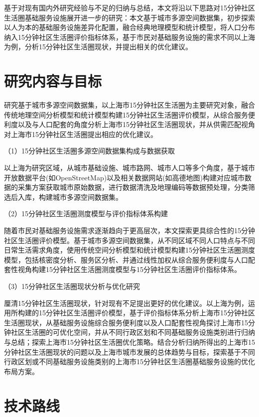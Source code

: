 \documentclass{shnuthesis}
\begin{document}
基于对现有国内外研究经验与不足的归纳与总结，本文将沿以下思路对15分钟社区生活圈基础服务设施展开进一步的研究：本文基于城市多源空间数据集，初步探索以人为本的基础服务设施差异化配置，融合经典地理模型和统计模型，将人口分布纳入15分钟社区生活圈评价指标体系，基于市民对基础服务设施的需求不同以上海为例，分析15分钟社区生活圈现状，并提出相关的优化建议。


\section{研究内容与目标}

研究基于城市多源空间数据集，以上海市15分钟社区生活圈为主要研究对象，融合传统地理空间分析模型和统计模型构建15分钟社区生活圈评价模型，从综合服务便利度以及与人口配套的角度分析上海市15分钟社区生活圈现状，并从供需匹配视角对上海市15分钟社区生活圈提出相应的优化建议。

（1）15分钟社区生活圈多源空间数据集构成与数据获取

以上海为研究区域，从城市基础设施、城市路网、城市人口等多个角度，基于城市开放数据平台(如OpenStreetMap)以及相关数据网站(如高德地图)构建对应城市数据的采集方案获取城市原始数据，进行数据清洗及地理编码等数据预处理，分类筛选后入库，构建城市多源空间数据集。

（2）15分钟社区生活圈测度模型与评价指标体系构建

随着市民对基础服务设施需求逐渐趋向于更高层次，本文探索更具综合性的15分钟社区生活圈评价模型。基于城市多源空间数据集，从不同区域不同人口特点与不同日常生活需求角度，使用传统空间分析模型和统计模型构建15分钟社区生活圈测度模型，包括核密度分析、服务区分析、并通过线性加权从综合服务便利度与人口配套性视角构建15分钟社区生活圈测度模型与15分钟社区生活圈评价指标体系。

（3）15分钟社区生活圈现状分析与优化研究

厘清15分钟社区生活圈现状，针对现有不足提出更好的优化建议。以上海为例，运用所构建的15分钟社区生活圈评价模型，基于评价指标体系分析上海市15分钟社区生活圈现状，从基础服务设施综合服务便利度以及人口配套性视角探讨上海市15分钟社区生活圈的可优化空间，并从不同行政区划和不同基础服务设施类别进行归纳与总结；探索上海市15分钟社区生活圈优化策略。结合分析归纳所得出的上海市15分钟社区生活圈现状的问题以及上海市城市发展的总体趋势与目标，探索基于不同行政区划或不同基础服务设施类别的上海市15分钟社区生活圈基础服务设施的优化布局方案。

\section{技术路线}
\end{document}
